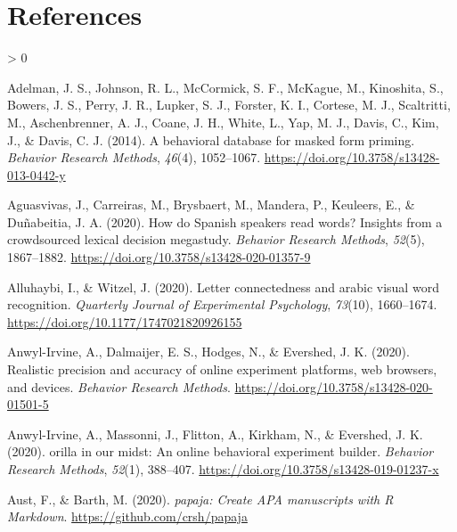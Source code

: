 \documentclass[
  english,
  man,floatsintext]{apa6}
\newlength{\cslhangindent}
\newenvironment{CSLReferences}[2] %
 {%
  \setlength{\parindent}{0pt}
  \ifodd #1 \everypar{\setlength{\hangindent}{\cslhangindent}}\ignorespaces\fi
  \ifnum #2 > 0
  \setlength{\parskip}{#2\baselineskip}
  \fi
 }%
 {}
\begin{document}
\newpage

\hypertarget{references}{%
\section{References}\label{references}}

\begingroup
\setlength{\parindent}{-0.5in}
\setlength{\leftskip}{0.5in}

\hypertarget{refs}{}
\begin{CSLReferences}{1}{0}
\leavevmode\hypertarget{ref-adelman2014}{}%
Adelman, J. S., Johnson, R. L., McCormick, S. F., McKague, M., Kinoshita, S., Bowers, J. S., Perry, J. R., Lupker, S. J., Forster, K. I., Cortese, M. J., Scaltritti, M., Aschenbrenner, A. J., Coane, J. H., White, L., Yap, M. J., Davis, C., Kim, J., \& Davis, C. J. (2014). A behavioral database for masked form priming. \emph{Behavior Research Methods}, \emph{46}(4), 1052--1067. \url{https://doi.org/10.3758/s13428-013-0442-y}

\leavevmode\hypertarget{ref-aguasvivas2020}{}%
Aguasvivas, J., Carreiras, M., Brysbaert, M., Mandera, P., Keuleers, E., \& Duñabeitia, J. A. (2020). How do Spanish speakers read words? Insights from a crowdsourced lexical decision megastudy. \emph{Behavior Research Methods}, \emph{52}(5), 1867--1882. \url{https://doi.org/10.3758/s13428-020-01357-9}

\leavevmode\hypertarget{ref-Alluhaybi_2020}{}%
Alluhaybi, I., \& Witzel, J. (2020). Letter connectedness and arabic visual word recognition. \emph{Quarterly Journal of Experimental Psychology}, \emph{73}(10), 1660--1674. \url{https://doi.org/10.1177/1747021820926155}

\leavevmode\hypertarget{ref-anwyl-irvine2020a}{}%
Anwyl-Irvine, A., Dalmaijer, E. S., Hodges, N., \& Evershed, J. K. (2020). Realistic precision and accuracy of online experiment platforms, web browsers, and devices. \emph{Behavior Research Methods}. \url{https://doi.org/10.3758/s13428-020-01501-5}

\leavevmode\hypertarget{ref-anwyl-irvine2020}{}%
Anwyl-Irvine, A., Massonni, J., Flitton, A., Kirkham, N., \& Evershed, J. K. (2020). orilla in our midst: An online behavioral experiment builder. \emph{Behavior Research Methods}, \emph{52}(1), 388--407. \url{https://doi.org/10.3758/s13428-019-01237-x}

\leavevmode\hypertarget{ref-R-papaja}{}%
Aust, F., \& Barth, M. (2020). \emph{{papaja}: {Create} {APA} manuscripts with {R Markdown}}. \url{https://github.com/crsh/papaja}


\end{CSLReferences}
\end{document}
